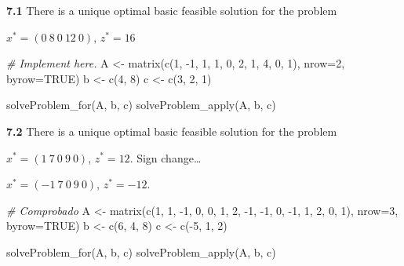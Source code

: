 \documentclass[
]{article}
\newenvironment{Shaded}{\begin{snugshade}}{\end{snugshade}}
\newcommand{\AttributeTok}[1]{\textcolor[rgb]{0.77,0.63,0.00}{#1}}
\newcommand{\CommentTok}[1]{\textcolor[rgb]{0.56,0.35,0.01}{\textit{#1}}}
\newcommand{\ConstantTok}[1]{\textcolor[rgb]{0.00,0.00,0.00}{#1}}
\newcommand{\DecValTok}[1]{\textcolor[rgb]{0.00,0.00,0.81}{#1}}
\newcommand{\FunctionTok}[1]{\textcolor[rgb]{0.00,0.00,0.00}{#1}}
\newcommand{\NormalTok}[1]{#1}
\newcommand{\OtherTok}[1]{\textcolor[rgb]{0.56,0.35,0.01}{#1}}
\newcommand{\SpecialCharTok}[1]{\textcolor[rgb]{0.00,0.00,0.00}{#1}}
\begin{document}
\textbf{7.1} There is a unique optimal basic feasible solution for the
problem

\(x^*= (0\  8\  0\ 12\  0)\), \(z^*= 16\)

\begin{Shaded}
\begin{Highlighting}[]
\CommentTok{\# Implement here.}
\NormalTok{A }\OtherTok{\textless{}{-}} \FunctionTok{matrix}\NormalTok{(}\FunctionTok{c}\NormalTok{(}\DecValTok{1}\NormalTok{, }\SpecialCharTok{{-}}\DecValTok{1}\NormalTok{, }\DecValTok{1}\NormalTok{, }\DecValTok{1}\NormalTok{, }\DecValTok{0}\NormalTok{, }\DecValTok{2}\NormalTok{, }\DecValTok{1}\NormalTok{, }\DecValTok{4}\NormalTok{, }\DecValTok{0}\NormalTok{, }\DecValTok{1}\NormalTok{), }\AttributeTok{nrow=}\DecValTok{2}\NormalTok{, }\AttributeTok{byrow=}\ConstantTok{TRUE}\NormalTok{)}
\NormalTok{b }\OtherTok{\textless{}{-}} \FunctionTok{c}\NormalTok{(}\DecValTok{4}\NormalTok{, }\DecValTok{8}\NormalTok{)}
\NormalTok{c }\OtherTok{\textless{}{-}} \FunctionTok{c}\NormalTok{(}\DecValTok{3}\NormalTok{, }\DecValTok{2}\NormalTok{, }\DecValTok{1}\NormalTok{)}

\FunctionTok{solveProblem\_for}\NormalTok{(A, b, c)}
\FunctionTok{solveProblem\_apply}\NormalTok{(A, b, c)}
\end{Highlighting}
\end{Shaded}

\textbf{7.2} There is a unique optimal basic feasible solution for the
problem

\(x^*= (1\ 7\ 0\ 9\ 0)\), \(z^*= 12\). Sign change\ldots{}

\(x^*= (-1\ 7\ 0\ 9\ 0)\), \(z^*= -12\).

\begin{Shaded}
\begin{Highlighting}[]
\CommentTok{\# Comprobado}
\NormalTok{A }\OtherTok{\textless{}{-}} \FunctionTok{matrix}\NormalTok{(}\FunctionTok{c}\NormalTok{(}\DecValTok{1}\NormalTok{, }\DecValTok{1}\NormalTok{, }\SpecialCharTok{{-}}\DecValTok{1}\NormalTok{, }\DecValTok{0}\NormalTok{, }\DecValTok{0}\NormalTok{, }\DecValTok{1}\NormalTok{, }\DecValTok{2}\NormalTok{, }\SpecialCharTok{{-}}\DecValTok{1}\NormalTok{, }\SpecialCharTok{{-}}\DecValTok{1}\NormalTok{, }\DecValTok{0}\NormalTok{, }\SpecialCharTok{{-}}\DecValTok{1}\NormalTok{, }\DecValTok{1}\NormalTok{, }\DecValTok{2}\NormalTok{, }\DecValTok{0}\NormalTok{, }\DecValTok{1}\NormalTok{), }\AttributeTok{nrow=}\DecValTok{3}\NormalTok{, }\AttributeTok{byrow=}\ConstantTok{TRUE}\NormalTok{)}
\NormalTok{b }\OtherTok{\textless{}{-}} \FunctionTok{c}\NormalTok{(}\DecValTok{6}\NormalTok{, }\DecValTok{4}\NormalTok{, }\DecValTok{8}\NormalTok{)}
\NormalTok{c }\OtherTok{\textless{}{-}} \FunctionTok{c}\NormalTok{(}\SpecialCharTok{{-}}\DecValTok{5}\NormalTok{, }\DecValTok{1}\NormalTok{, }\DecValTok{2}\NormalTok{)}

\FunctionTok{solveProblem\_for}\NormalTok{(A, b, c)}
\FunctionTok{solveProblem\_apply}\NormalTok{(A, b, c)}
\end{Highlighting}
\end{Shaded}
\end{document}
